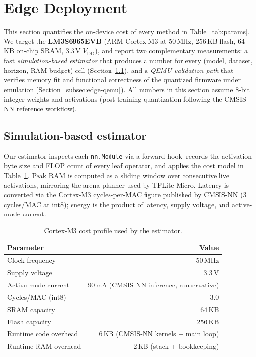 \documentclass[journal]{IEEEtran}
\theoremstyle{remark}
\begin{document}
\section{Edge Deployment}
\label{sec:edge}

This section quantifies the on-device cost of every method in
Table~\ref{tab:params}. We target the
\textbf{LM3S6965EVB} (ARM Cortex-M3 at 50\,MHz, $256$\,KB flash,
$64$\,KB on-chip SRAM, $3.3$\,V $V_{\mathrm{DD}}$), and report two
complementary measurements: a fast \emph{simulation-based estimator}
that produces a number for every (model, dataset, horizon, RAM
budget) cell (Section~\ref{subsec:edge-estimator}), and a
\emph{QEMU validation path} that verifies memory fit and functional
correctness of the quantized firmware under emulation
(Section~\ref{subsec:edge-qemu}). All numbers in this section assume
$8$-bit integer weights and activations (post-training quantization
following the CMSIS-NN reference workflow).

\subsection{Simulation-based estimator}
\label{subsec:edge-estimator}
Our estimator inspects each \texttt{nn.Module} via a forward hook,
records the activation byte size and FLOP count of every leaf
operator, and applies the cost model in
Table~\ref{tab:m3-profile}. Peak RAM is computed as a sliding window
over consecutive live activations, mirroring the arena planner used
by TFLite-Micro. Latency is converted via the Cortex-M3
cycles-per-MAC figure published by CMSIS-NN
($3$ cycles/MAC at int8); energy is the product of latency, supply
voltage, and active-mode current.

\begin{table}[t]
\centering
\caption{Cortex-M3 cost profile used by the estimator.}
\label{tab:m3-profile}
\small
\begin{tabular}{lr}
\toprule
Parameter & Value \\
\midrule
Clock frequency        & $50$\,MHz \\
Supply voltage         & $3.3$\,V \\
Active-mode current    & $90$\,mA (CMSIS-NN inference, conservative) \\
Cycles/MAC (int8)      & $3.0$ \\
SRAM capacity          & $64$\,KB \\
Flash capacity         & $256$\,KB \\
Runtime code overhead  & $6$\,KB (CMSIS-NN kernels + main loop) \\
Runtime RAM overhead   & $2$\,KB (stack + bookkeeping) \\
\bottomrule
\end{tabular}
\end{table}
\end{document}
